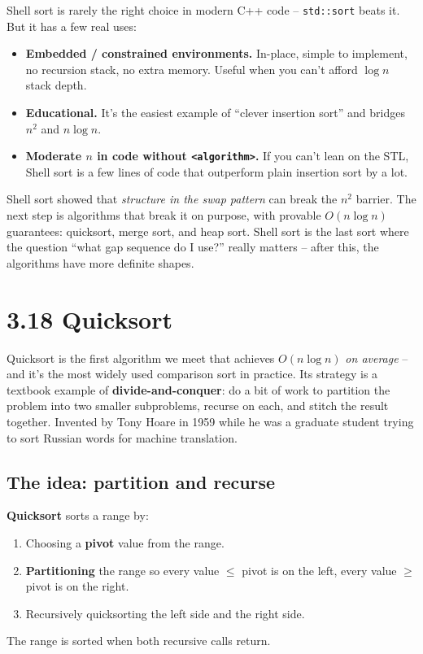 \documentclass[11pt]{article}
\begin{document}
\begin{ideabox}
Shell sort is rarely the right choice in modern C++ code --
\texttt{std::sort} beats it. But it has a few real uses:
\begin{itemize}[leftmargin=*]
  \item \textbf{Embedded / constrained environments.} In-place,
        simple to implement, no recursion stack, no extra memory.
        Useful when you can't afford $\log n$ stack depth.
  \item \textbf{Educational.} It's the easiest example of ``clever
        insertion sort'' and bridges $n^2$ and $n \log n$.
  \item \textbf{Moderate $n$ in code without \texttt{<algorithm>}.}
        If you can't lean on the STL, Shell sort is a few lines of
        code that outperform plain insertion sort by a lot.
\end{itemize}
\end{ideabox}

\begin{notebox}
Shell sort showed that \emph{structure in the swap pattern} can
break the $n^2$ barrier. The next step is algorithms that break it
on purpose, with provable $O(n \log n)$ guarantees: quicksort, merge
sort, and heap sort. Shell sort is the last sort where the question
``what gap sequence do I use?'' really matters -- after this, the
algorithms have more definite shapes.
\end{notebox}

\section{3.18 Quicksort}

Quicksort is the first algorithm we meet that achieves
$O(n \log n)$ \emph{on average} -- and it's the most widely used
comparison sort in practice. Its strategy is a textbook example of
\textbf{divide-and-conquer}: do a bit of work to partition the
problem into two smaller subproblems, recurse on each, and stitch
the result together. Invented by Tony Hoare in 1959 while he was a
graduate student trying to sort Russian words for machine
translation.

\subsection{The idea: partition and recurse}

\begin{defnbox}[Quicksort]
\textbf{Quicksort} sorts a range by:
\begin{enumerate}[leftmargin=*]
  \item Choosing a \textbf{pivot} value from the range.
  \item \textbf{Partitioning} the range so every value $\le$ pivot is
        on the left, every value $\ge$ pivot is on the right.
  \item Recursively quicksorting the left side and the right side.
\end{enumerate}
The range is sorted when both recursive calls return.
\end{defnbox}
\end{document}
